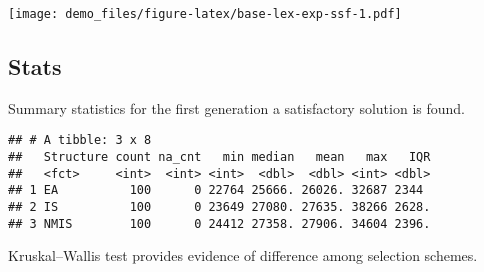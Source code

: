 \documentclass[]{book}
\newenvironment{Shaded}{\begin{snugshade}}{\end{snugshade}}
\newcommand{\CharTok}[1]{\textcolor[rgb]{0.31,0.60,0.02}{#1}}
\newcommand{\DataTypeTok}[1]{\textcolor[rgb]{0.13,0.29,0.53}{#1}}
\newcommand{\DecValTok}[1]{\textcolor[rgb]{0.00,0.00,0.81}{#1}}
\newcommand{\KeywordTok}[1]{\textcolor[rgb]{0.13,0.29,0.53}{\textbf{#1}}}
\newcommand{\NormalTok}[1]{#1}
\newcommand{\OperatorTok}[1]{\textcolor[rgb]{0.81,0.36,0.00}{\textbf{#1}}}
\newcommand{\OtherTok}[1]{\textcolor[rgb]{0.56,0.35,0.01}{#1}}
\newcommand{\StringTok}[1]{\textcolor[rgb]{0.31,0.60,0.02}{#1}}
\begin{document}
\texttt{[image: demo\_files/figure-latex/base-lex-exp-ssf-1.pdf]}

\hypertarget{stats-2}{%
\subsection{Stats}\label{stats-2}}

Summary statistics for the first generation a satisfactory solution is found.

\begin{Shaded}
\end{Shaded}

\begin{verbatim}
## # A tibble: 3 x 8
##   Structure count na_cnt   min median   mean   max   IQR
##   <fct>     <int>  <int> <int>  <dbl>  <dbl> <int> <dbl>
## 1 EA          100      0 22764 25666. 26026. 32687 2344 
## 2 IS          100      0 23649 27080. 27635. 38266 2628.
## 3 NMIS        100      0 24412 27358. 27906. 34604 2396.
\end{verbatim}

Kruskal--Wallis test provides evidence of difference among selection schemes.
\end{document}
